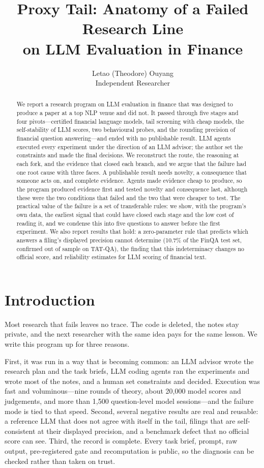 \documentclass[11pt]{article}
\title{Proxy Tail: Anatomy of a Failed Research Line\\on LLM Evaluation in Finance}
\author{Letao (Theodore) Ouyang \\
  Independent Researcher}
\begin{document}
\maketitle

\begin{abstract}
We report a research program on LLM evaluation in finance that was designed to produce a paper at a top NLP venue and did not. It passed through five stages and four pivots---certified financial language models, tail screening with cheap models, the self-stability of LLM scores, two behavioural probes, and the rounding precision of financial question answering---and ended with no publishable result. LLM agents executed every experiment under the direction of an LLM advisor; the author set the constraints and made the final decisions. We reconstruct the route, the reasoning at each fork, and the evidence that closed each branch, and we argue that the failure had one root cause with three faces. A publishable result needs novelty, a consequence that someone acts on, and complete evidence. Agents made evidence cheap to produce, so the program produced evidence first and tested novelty and consequence last, although these were the two conditions that failed and the two that were cheaper to test. The practical value of the failure is a set of transferable rules: we show, with the program's own data, the earliest signal that could have closed each stage and the low cost of reading it, and we condense this into five questions to answer before the first experiment. We also report results that hold: a zero-parameter rule that predicts which answers a filing's displayed precision cannot determine (10.7\% of the FinQA test set, confirmed out of sample on TAT-QA), the finding that this indeterminacy changes no official score, and reliability estimates for LLM scoring of financial text.
\end{abstract}

\section{Introduction}

Most research that fails leaves no trace. The code is deleted, the notes stay private, and the next researcher with the same idea pays for the same lesson. We write this program up for three reasons.

First, it was run in a way that is becoming common: an LLM advisor wrote the research plan and the task briefs, LLM coding agents ran the experiments and wrote most of the notes, and a human set constraints and decided. Execution was fast and voluminous---nine rounds of theory, about 20{,}000 model scores and judgements, and more than 1{,}500 question-level model sessions---and the failure mode is tied to that speed. Second, several negative results are real and reusable: a reference LLM that does not agree with itself in the tail, filings that are self-consistent at their displayed precision, and a benchmark defect that no official score can see. Third, the record is complete. Every task brief, prompt, raw output, pre-registered gate and recomputation is public, so the diagnosis can be checked rather than taken on trust.
\end{document}
